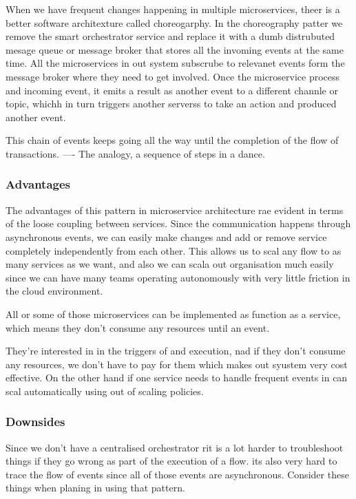 \documentclass[a4paper, 11pt]{book}
\begin{document}
    When we have frequent changes happening in multiple microservices, theer is a better software architexture called choreogarphy.
    In the choreography patter we remove the smart orchestrator service and replace it with a dumb distrubuted mesage queue or message broker that stores all the invoming events at the same time.
    All the microservices in out system subscrube to relevanet events form the message broker where they need to get involved.
    Once the microservice process and incoming event, it emits a result as another event to a different channle or topic, whichh in turn triggers another serverss to take an action and produced another event.

    This chain of events keeps going all the way until the completion of the flow of transactions.
    ---- The analogy, a sequence of steps in a dance.

    \subsubsection{Advantages}
    The advantages of this pattern in microservice architecture rae evident in terms of the loose coupling between services.
    Since the communication happens through asynchronous events, we can easily make changes and add or remove service completely independently from each other.
    This allows us to scal any flow to as many services as we want, and also we can scala out organisation much easily since we can have many teams operating autonomously with very little friction in the cloud environment.

    All or some of those microservices can be implemented as function as a service, which means they don't consume any resources until an event.

    They're interested in in the triggers of and execution, nad if they don't consume any resources, we don't have to pay for them which makes out syustem very cost effective.
    On the other hand if one service needs to handle frequent events in can scal automatically using out of scaling policies.

    \subsubsection{Downsides}
    Since we don't have a centralised orchestrator rit is a lot harder to troubleshoot things if they go wrong as part of the execution of a flow.
    its also very hard to trace the flow of events since all of those events are asynchronous.
    Consider these things when planing in using that pattern.
\end{document}
